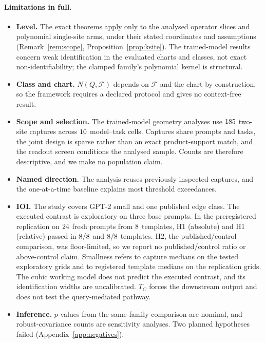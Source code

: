 \paragraph{Limitations in full.}
\begin{itemize}[leftmargin=1.2em,itemsep=1pt,topsep=2pt,parsep=0pt]
\item \textbf{Level.} The exact theorems apply only to the analysed operator slices and polynomial single-site arms,
under their stated coordinates and assumptions (Remark~\ref{rem:scope}, Proposition~\ref{prop:ksite}). The
trained-model results concern weak identification in the evaluated charts and classes, not exact non-identifiability;
the clamped family's polynomial kernel is structural.
\item \textbf{Class and chart.} $N(Q,\mathcal F)$ depends on $\mathcal F$ and the chart by construction, so the
framework requires a declared protocol and gives no context-free result.
\item \textbf{Scope and selection.} The trained-model geometry analyses use $185$ two-site captures across $10$
model--task cells. Captures share prompts and tasks, the joint design is sparse rather than an exact product-support
match, and the readout screen conditions the analysed sample. Counts are therefore descriptive, and we make no
population claim.
\item \textbf{Named direction.} The analysis reuses previously inspected captures, and the one-at-a-time baseline
explains most threshold exceedances.
\item \textbf{IOI.} The study covers GPT-2 small and one published edge class. The executed contrast is exploratory on
three base prompts. In the preregistered replication on $24$ fresh prompts from $8$ templates, H1 (absolute) and H1
(relative) passed in $8/8$ and $8/8$ templates. H2, the published/control comparison, was
floor-limited, so we report no published/control ratio or above-control claim. Smallness refers to capture medians on the tested exploratory grids and to registered template medians on the
replication grids. The cubic working model does not predict the executed contrast, and
its identification widths are uncalibrated. $T_C$ forces the downstream output and does not test the query-mediated
pathway.
\item \textbf{Inference.} $p$-values from the same-family comparison are nominal, and robust-covariance counts are sensitivity
analyses. Two planned hypotheses failed (Appendix~\ref{app:negatives}).
\end{itemize}


